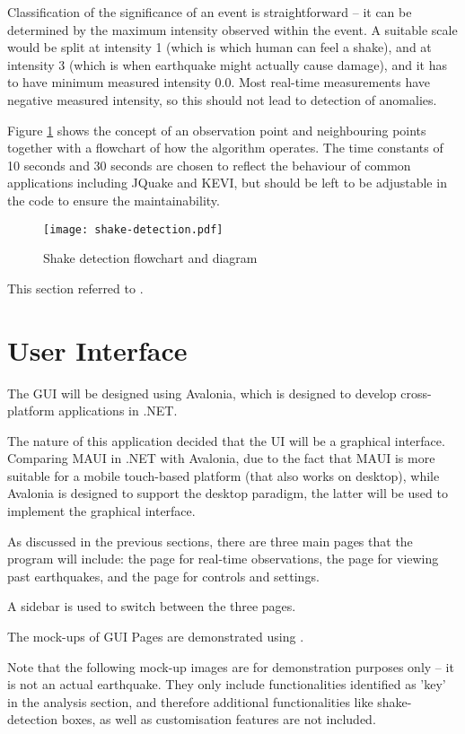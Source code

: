Classification of the significance of an event is straightforward -- it can be determined by the maximum intensity observed within the event. A suitable scale would be split at intensity 1 (which is which human can feel a shake), and at intensity 3 (which is when earthquake might actually cause damage), and it has to have minimum measured intensity 0.0. Most real-time measurements have negative measured intensity, so this should not lead to detection of anomalies.

Figure \ref{fig:shake-detection-diag} shows the concept of an observation point and neighbouring points together with a flowchart of how the algorithm operates. The time constants of 10 seconds and 30 seconds are chosen to reflect the behaviour of common applications including JQuake and KEVI, but should be left to be adjustable in the code to ensure the maintainability.

\begin{figure}[htp]
    \centering
    \texttt{[image: shake-detection.pdf]}
    \caption{Shake detection flowchart and diagram}
    \label{fig:shake-detection-diag}
\end{figure}

This section referred to \autocite{blog-ingen-shake-detection}.

\section{User Interface}

The GUI will be designed using Avalonia, which is designed to develop cross-platform applications in .NET.

The nature of this application decided that the UI will be a graphical interface. Comparing MAUI in .NET with Avalonia, due to the fact that MAUI is more suitable for a mobile touch-based platform (that also works on desktop), while Avalonia is designed to support the desktop paradigm, the latter will be used to implement the graphical interface.

As discussed in the previous sections, there are three main pages that the program will include: the page for real-time observations, the page for viewing past earthquakes, and the page for controls and settings.

A sidebar is used to switch between the three pages.

The mock-ups of GUI Pages are demonstrated using \autocite{soft-balsamiq}.

Note that the following mock-up images are for demonstration purposes only -- it is not an actual earthquake. They only include functionalities identified as 'key' in the analysis section, and therefore additional functionalities like shake-detection boxes, as well as customisation features are not included.

